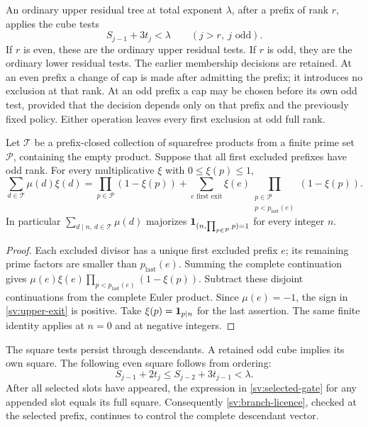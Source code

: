 An ordinary upper residual tree at total exponent $\lambda$, after
a prefix of rank $r$, applies the cube tests
\begin{equation}\label{sv:upper-cubes}
 S_{j-1}+3t_j<\lambda\qquad(j>r,\ j\text{ odd}).
\end{equation}
If $r$ is even, these are the ordinary upper residual tests.  If $r$
is odd, they are the ordinary lower residual tests.  The earlier
membership decisions are retained.  At an even prefix a change of cap
is made after admitting the prefix; it introduces no exclusion at that
rank.  At an odd prefix a cap may be chosen before its own odd test,
provided that the decision depends only on that prefix and the
previously fixed policy.  Either operation leaves every first
exclusion at odd full rank.

\begin{lemma}\label{sv:first-exit}
Let $\mathcal T$ be a prefix-closed collection of squarefree products
from a finite prime set $\mathcal P$, containing the empty product.
Suppose that all first excluded prefixes have odd rank.  For every
multiplicative $\xi$ with $0\le \xi(p)\le1$,
\begin{equation}\label{sv:upper-exit}
 \sum_{d\in\mathcal T}\mu(d)\xi(d)
 =\prod_{p\in\mathcal P}(1-\xi(p))
 +\sum_{e\text{ first exit}}\xi(e)
           \prod_{\substack{p\in\mathcal P\\p<p_{\mathrm{last}}(e)}}
                            (1-\xi(p)).
\end{equation}
In particular $\sum_{d\mid n,\ d\in\mathcal T}\mu(d)$ majorizes
$\mathbf 1_{(n,\prod_{p\in\mathcal P}p)=1}$ for every integer $n$.
\end{lemma}

\begin{proof}
Each excluded divisor has a unique first excluded prefix $e$; its
remaining prime factors are smaller than $p_{\mathrm{last}}(e)$.
Summing the complete continuation gives
$\mu(e)\xi(e)\prod_{p<p_{\mathrm{last}}(e)}(1-\xi(p))$.
Subtract these disjoint continuations from the complete Euler product.
Since $\mu(e)=-1$, the sign in \eqref{sv:upper-exit} is positive.
Take $\xi(p)=\mathbf 1_{p\mid n}$ for the last assertion.  The same
finite identity applies at $n=0$ and at negative integers.
\end{proof}

The square tests persist through descendants.  A retained odd cube
implies its own square.  The following even square follows from
ordering:
\begin{equation}\label{sv:descendant-square}
 S_{j-1}+2t_j\le S_{j-2}+3t_{j-1}<\lambda.
\end{equation}
After all selected slots have appeared, the expression in
\eqref{sv:selected-gate} for any appended slot equals its full square.
Consequently \eqref{sv:branch-licence}, checked at the selected prefix,
continues to control the complete descendant vector.

